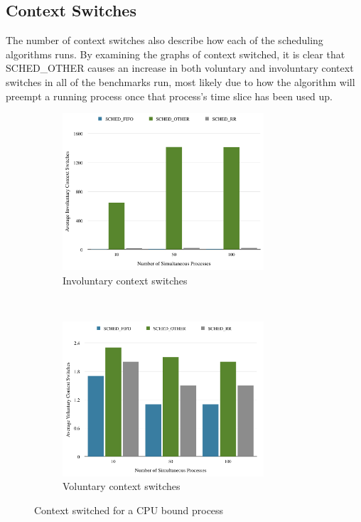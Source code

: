 \documentclass[12pt]{article}
\begin{document}
\subsection{Context Switches}
The number of context switches also describe how each of the scheduling 
algorithms runs. By examining the graphs of context switched, it is clear that
{\ttfamily SCHED\_OTHER} causes an increase in both voluntary and involuntary
context switches in all of the benchmarks run, most likely due to how the
algorithm will preempt a running process once that process's time slice has been
used up.

\begin{figure}[!htb]
  \centering
  \begin{subfigure}[t]{0.4\textwidth}
    \centering
    \includegraphics[width=75mm]{CPUIC.png}
    \caption{Involuntary context switches}
    \label{fig:cpuic}
  \end{subfigure}
  ~
  \begin{subfigure}[t]{0.4\textwidth}
    \centering
    \includegraphics[width=75mm]{CPUVC.png}
    \caption{Voluntary context switches}
    \label{fig:cpuvc}
  \end{subfigure}
  \caption{Context switched for a CPU bound process}
\end{figure}
\end{document}
